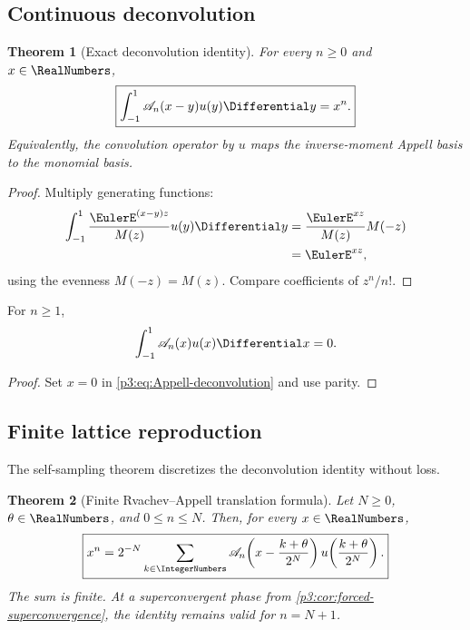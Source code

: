 \documentclass[11pt,oneside]{article}
\numberwithin{equation}{section}
\newtheorem{theorem}{Theorem}[section]
\theoremstyle{definition}
\theoremstyle{remark}
\begin{document}
\subsection{Continuous deconvolution}

\begin{theorem}[Exact deconvolution identity]
\label{p3:thm:Appell-deconvolution}
For every $n\ge0$ and $x\in\RealNumbers$,
\begin{equation}
 \boxed{\displaystyle
 \int_{-1}^{1}\Acal_n(x-y)u(y)\Differential y=x^n.}
 \label{p3:eq:Appell-deconvolution}
\end{equation}
Equivalently, the convolution operator by $u$ maps the inverse-moment Appell basis to the monomial basis.
\end{theorem}

\begin{proof}
Multiply generating functions:
\begin{align*}
 \int_{-1}^{1}\frac{\EulerE^{(x-y)z}}{M(z)}u(y)\Differential y
 &=\frac{\EulerE^{xz}}{M(z)}M(-z)\\
 &=\EulerE^{xz},
\end{align*}
using the evenness $M(-z)=M(z)$.  Compare coefficients of $z^n/n!$.
\end{proof}

\begin{corollary}
\label{p3:cor:Appell-mean-zero}
For $n\ge1$,
\begin{equation}
 \int_{-1}^{1}\Acal_n(x)u(x)\Differential x=0.
 \label{p3:eq:Appell-mean-zero}
\end{equation}
\end{corollary}

\begin{proof}
Set $x=0$ in \eqref{p3:eq:Appell-deconvolution} and use parity.
\end{proof}

\subsection{Finite lattice reproduction}

The self-sampling theorem discretizes the deconvolution identity without loss.

\begin{theorem}[Finite Rvachev--Appell translation formula]
\label{p3:thm:Appell-lattice-reproduction}
Let $N\ge0$, $\theta\in\RealNumbers$, and $0\le n\le N$.  Then, for every $x\in\RealNumbers$,
\begin{equation}
 \boxed{\displaystyle
 x^n=2^{-N}\sum_{k\in\IntegerNumbers}
 \Acal_n\!\left(x-\frac{k+\theta}{2^N}\right)
 u\!\left(\frac{k+\theta}{2^N}\right).}
 \label{p3:eq:Appell-lattice-reproduction}
\end{equation}
The sum is finite.  At a superconvergent phase from \cref{p3:cor:forced-superconvergence}, the identity remains valid for $n=N+1$.
\end{theorem}
\end{document}
